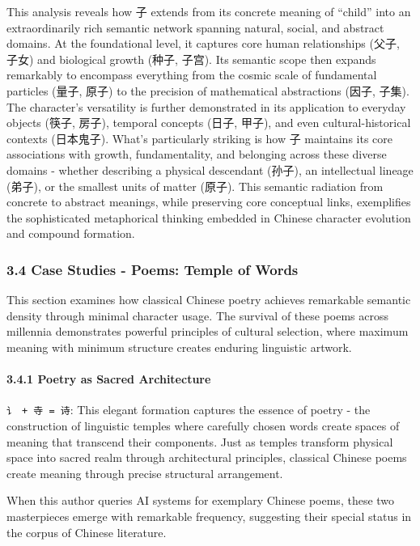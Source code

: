 This analysis reveals how 子 extends from its concrete meaning of
``child'' into an extraordinarily rich semantic network spanning
natural, social, and abstract domains. At the foundational level, it
captures core human relationships (父子, 子女) and biological growth
(种子, 子宫). Its semantic scope then expands remarkably to encompass
everything from the cosmic scale of fundamental particles (量子, 原子)
to the precision of mathematical abstractions (因子, 子集). The
character's versatility is further demonstrated in its application to
everyday objects (筷子, 房子), temporal concepts (日子, 甲子), and even
cultural-historical contexts (日本鬼子). What's particularly striking is
how 子 maintains its core associations with growth, fundamentality, and
belonging across these diverse domains - whether describing a physical
descendant (孙子), an intellectual lineage (弟子), or the smallest units
of matter (原子). This semantic radiation from concrete to abstract
meanings, while preserving core conceptual links, exemplifies the
sophisticated metaphorical thinking embedded in Chinese character
evolution and compound formation.

\subsubsection{3.4 Case Studies - Poems: Temple of
Words}\label{case-studies---poems-temple-of-words}

This section examines how classical Chinese poetry achieves remarkable
semantic density through minimal character usage. The survival of these
poems across millennia demonstrates powerful principles of cultural
selection, where maximum meaning with minimum structure creates enduring
linguistic artwork.

\paragraph{3.4.1 Poetry as Sacred
Architecture}\label{poetry-as-sacred-architecture}

\texttt{讠\ +\ 寺\ =\ 诗}: This elegant formation captures the essence
of poetry - the construction of linguistic temples where carefully
chosen words create spaces of meaning that transcend their components.
Just as temples transform physical space into sacred realm through
architectural principles, classical Chinese poems create meaning through
precise structural arrangement.

When this author queries AI systems for exemplary Chinese poems, these
two masterpieces emerge with remarkable frequency, suggesting their
special status in the corpus of Chinese literature.

